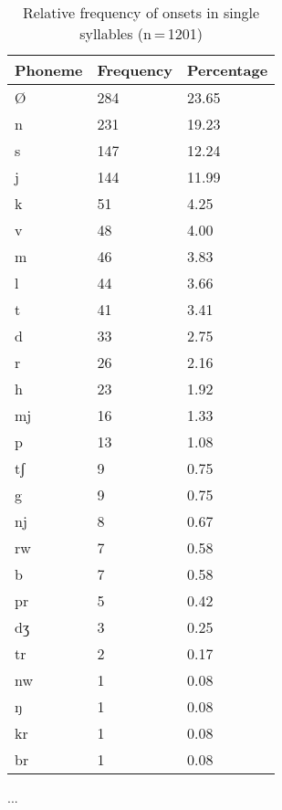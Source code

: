 \begin{table}[hp]\centering
\caption[Relative frequency of onsets in single syllables]{Relative frequency of onsets in single syllables (n\,=\,1201)}
\begin{tabu} to 0.5\textwidth{X X[c] X[c]}
\tableheaderfont\toprule
Phoneme
	& Frequency
	& Percentage
	\\
	
\toprule

Ø
	& 284
	& 23.65\pct
	\\

\midrule

n
	& 231
	& 19.23\pct
	\\
s
	& 147
	& 12.24\pct
	\\
j
	& 144
	& 11.99\pct
	\\
k
	& 51
	& 4.25\pct
	\\
v
	& 48
	& 4.00\pct
	\\
m
	& 46
	& 3.83\pct
	\\
l
	& 44
	& 3.66\pct
	\\
t
	& 41
	& 3.41\pct
	\\
d
	& 33
	& 2.75\pct
	\\
r
	& 26
	& 2.16\pct
	\\
h
	& 23
	& 1.92\pct
	\\
mj
	& 16
	& 1.33\pct
	\\
p
	& 13
	& 1.08\pct
	\\
tʃ
	& 9
	& 0.75\pct
	\\
g
	& 9
	& 0.75\pct
	\\
nj
	& 8
	& 0.67\pct
	\\
rw
	& 7
	& 0.58\pct
	\\
b
	& 7
	& 0.58\pct
	\\
pr
	& 5
	& 0.42\pct
	\\
dʒ
	& 3
	& 0.25\pct
	\\
tr
	& 2
	& 0.17\pct
	\\
nw
	& 1
	& 0.08\pct
	\\
ŋ
	& 1
	& 0.08\pct
	\\
kr
	& 1
	& 0.08\pct
	\\
br
	& 1
	& 0.08\pct
	\\

\bottomrule
\end{tabu}
\label{tab:singon}
\end{table}

...

